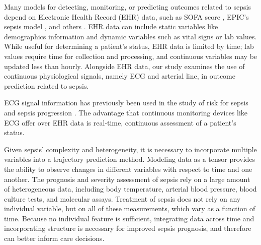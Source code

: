 Many models for detecting, monitoring, or predicting outcomes related to sepsis depend on Electronic Health Record (EHR) data, such as SOFA score \cite{sepsis-3}, EPIC's sepsis model \cite{wong_external_2021}, and others \cite{nesaragi_correlation_2021, morrill_signature_2019, taylor_prediction_2016}. EHR data can include static variables like demographics information and dynamic variables such as vital signs or lab values. While useful for determining a patient's status, EHR data is limited by time; lab values require time for collection and processing, and continuous variables may be updated less than hourly. Alongside EHR data, our study examines the use of continuous physiological signals, namely ECG and arterial line, in outcome prediction related to sepsis. 

ECG signal information has previously been used in the study of risk for sepsis and sepsis progression \cite{berger_shock_2013, moorman_cardiovascular_2011, nemati_interpretable_2018}. The advantage that continuous monitoring devices like ECG offer over EHR data is real-time, continuous assessment of a patient's status.

Given sepsis' complexity and heterogeneity, it is necessary to incorporate multiple variables into a trajectory prediction method. Modeling data as a tensor provides the ability to observe changes in different variables with respect to time and one another. The prognosis and severity assessment of sepsis rely on a large amount of heterogeneous data, including body temperature, arterial blood pressure, blood culture tests, and molecular assays. Treatment of sepsis does not rely on any individual variable, but on all of these measurements, which vary as a function of time. Because no individual feature is sufficient, integrating data across time and incorporating structure is necessary for improved sepsis prognosis, and therefore can better inform care decisions.

